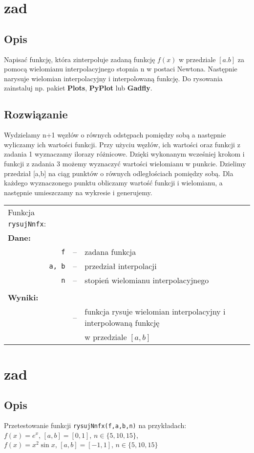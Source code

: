 \documentclass[10pt,a4paper, polish]{article}
\begin{document}
\section{zad}

\subsection*{Opis}
Napisać funkcję, która zinterpoluje zadaną funkcję $f(x)$ w przedziale $[a.b]$ za pomocą wielomianu interpolacyjnego stopnia n w postaci Newtona. Następnie narysuje wielomian interpolacyjny i interpolowaną funkcję. Do rysowania zainstaluj np. pakiet \textbf{Plots}, \textbf{PyPlot} lub \textbf{Gadfly}.

\subsection{Rozwiązanie}
Wydzielamy n+1 węzłów o równych odstępach pomiędzy sobą a następnie wyliczamy ich wartości funkcji. Przy użyciu węzłów, ich wartości oraz funkcji z zadania 1 wyznaczamy ilorazy różnicowe. Dzięki wykonanym wcześniej krokom i funkcji z zadania 3 możemy wyznaczyć wartości wielomianu w punkcie. Dzielimy przedział [a,b] na ciąg punktów o równych odległościach pomiędzy sobą. Dla każdego wyznaczonego punktu obliczamy wartość funkcji i wielomianu, a następnie umieszczamy na wykresie i generujemy.

\begin{longtable}[l]{r  c  l}
\multicolumn{1}{l}{Funkcja \texttt{rysujNnfx}:}&& \\
\multicolumn{1}{l}{\textbf{Dane:}}&& \\
\texttt{f}&--&zadana funkcja \\
\texttt{a, b}&--& przedział interpolacji \\
\texttt{n}&--& stopień wielomianu interpolacyjnego \\
&& \\
\multicolumn{1}{l}{\textbf{Wyniki:}}&& \\
&--&funkcja rysuje wielomian interpolacyjny i interpolowaną funkcję \\
&&w przedziale $[a,b]$ \\
\end{longtable}

\section{zad}
\subsection*{Opis}
Przetestowanie funkcji \texttt{rysujNnfx(f,a,b,n)} na przykładach:\\
$f(x) = e^x$, $[a, b] = [0,1]$, $n \in \{5,10,15\}$,\\
$f(x) = x^2\sin{x}$, $[a, b] = [-1,1]$, $n \in \{5,10,15\}$
\end{document}
